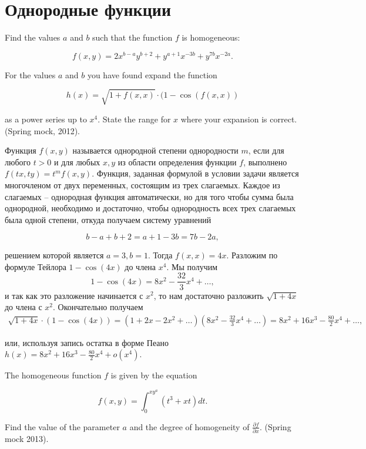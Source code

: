 

\section{Однородные функции}

\begin{problem}
Find the values $a$ and $b$ such that the function $f$ is homogeneous:

\[f(x,y)=2x^{b-a} y^{b+2} +y^{a+1} x^{-3b} +y^{7b} x^{-2a} .\] 

For the values $a$ and $b$ you have found expand the function

\[h(x)=\sqrt{1+f(x,x)} \cdot (1-\cos (f(x,x))\] 

as a power series up to $x^{4} $. State the range for $x$ where your expansion is correct. (Spring mock, 2012).
\end{problem}


\begin{solution}
Функция $f(x,y)$ называется однородной степени однородности $m$, если для любого $t>0$ и для любых $x,y$ из области определения функции $f$, выполнено $f(tx,ty)=t^{m} f(x,y)$. Функция, заданная формулой в условии задачи является многочленом от двух переменных, состоящим из трех слагаемых. Каждое из слагаемых -- однородная функция автоматически, но для того чтобы сумма была однородной, необходимо и достаточно, чтобы однородность всех трех слагаемых была одной степени, откуда получаем систему уравнений 

\[b-a+b+2=a+1-3b=7b-2a,\] 

решением которой является $a=3,  b=1$. Тогда $f(x,x)=4x$. Разложим по формуле Тейлора $1-\cos (4x)$ до члена $x^{4} $. Мы получим 
\[
1-\cos (4x)=8x^{2} -\frac{32}{3} x^{4} +\ldots,
\]
и так как это разложение начинается с $x^{2} $, то нам достаточно разложить $\sqrt{1+4x} $ до члена с $x^{2} $. Окончательно получаем 
\begin{multline}
\sqrt{1+4x} \cdot (1-\cos (4x))=(1+2x-2x^{2} +\ldots )(8x^{2} -\frac{32}{3} x^{4} + \ldots )=8x^{2} +16x^{3} -\frac{80}{2} x^{4} +\ldots,
\end{multline}

или, используя запись остатка в форме Пеано $h(x)=8x^{2} +16x^{3} -\frac{80}{2} x^{4} +o(x^{4} )$.
\end{solution}


\begin{problem}
The homogeneous function $f$ is given by the equation

\[
f(x,y)=\int _{0}^{xy^{a} }(t^{3} +xt)dt .
\] 


Find the value of the parameter $a$ and the degree of homogeneity of $\frac{\partial f}{\partial x} $. (Spring mock 2013).
\end{problem}


